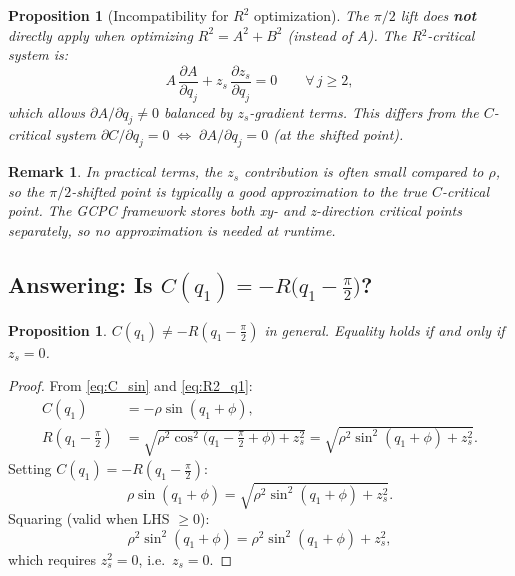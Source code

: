 \documentclass[11pt,a4paper]{article}
\newtheorem{proposition}[theorem]{Proposition}
\newtheorem{remark}{Remark}[section]
\begin{document}
\begin{proposition}[Incompatibility for $R^2$ optimization]\label{prop:R2_incompatible}
The $\pi/2$ lift does \textbf{not} directly apply when optimizing
$R^2 = A^2 + B^2$ (instead of $A$). The R$^2$-critical system is:
\begin{equation}\label{eq:R2_system}
  A\,\frac{\partial A}{\partial q_j}
  + z_s\,\frac{\partial z_s}{\partial q_j} = 0
  \qquad \forall\, j \ge 2,
\end{equation}
which allows $\partial A/\partial q_j \ne 0$ balanced by
$z_s$-gradient terms. This differs from the $C$-critical system
$\partial C/\partial q_j = 0 \;\Leftrightarrow\;
\partial A/\partial q_j = 0$ (at the shifted point).
\end{proposition}

\begin{remark}
In practical terms, the $z_s$ contribution is often small compared to
$\rho$, so the $\pi/2$-shifted point is typically a \emph{good
approximation} to the true $C$-critical point.
The GCPC framework stores both xy- and z-direction critical points
separately, so no approximation is needed at runtime.
\end{remark}


\subsection{Answering: Is $C(q_1) = -R\bigl(q_1 - \tfrac\pi2\bigr)$?}\label{sec:q1_answer}

\begin{proposition}\label{prop:C_neq_R}
$C(q_1) \ne -R(q_1 - \tfrac\pi2)$ in general. Equality holds if
and only if $z_s = 0$.
\end{proposition}

\begin{proof}
From \eqref{eq:C_sin} and \eqref{eq:R2_q1}:
\begin{align*}
  C(q_1) &= -\rho\sin(q_1+\phi), \\
  R(q_1-\tfrac\pi2)
  &= \sqrt{\rho^2\cos^2\bigl(q_1 - \tfrac\pi2 + \phi\bigr) + z_s^2}
  = \sqrt{\rho^2\sin^2(q_1+\phi) + z_s^2}.
\end{align*}
Setting $C(q_1) = -R(q_1-\tfrac\pi2)$:
\[
  \rho\sin(q_1+\phi) = \sqrt{\rho^2\sin^2(q_1+\phi) + z_s^2}.
\]
Squaring (valid when LHS $\ge 0$):
\[
  \rho^2\sin^2(q_1+\phi) = \rho^2\sin^2(q_1+\phi) + z_s^2,
\]
which requires $z_s^2 = 0$, i.e.\ $z_s = 0$.
\end{proof}
\end{document}
